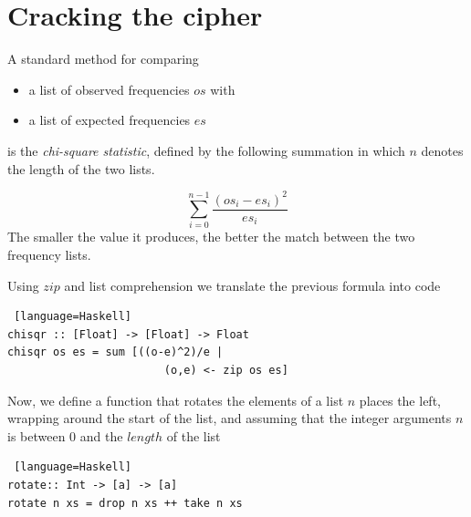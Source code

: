 \documentclass[11pt]{article}
\def\frametitle#1{}
\begin{document}
\section{Cracking the cipher}
\begin{frame}[fragile, label=freq3]
  \frametitle{Frequency Tables cont. } 
  A standard method for comparing 
  \begin{itemize}
  \item a list of observed frequencies $os$ with 
  \item a list of expected frequencies $es$ 
  \end{itemize}
  is the \textit{chi-square statistic}, defined by the following summation in which $n$ denotes the length of the two lists. 

\[\sum_{i=0}^{n-1} \frac{(os_i - es_i)^2}{es_i}\]
\pause
The smaller the value it produces, the better the match between the two frequency lists.  
\vspace{1cm}
\end{frame}

\begin{frame} [fragile, label = test]
  \frametitle{Frequency Tables cont. } 
Using $zip$ and list comprehension we translate the previous formula into code
 
     \begin{onlyenv}
  \begin{lstlisting} [language=Haskell]
chisqr :: [Float] -> [Float] -> Float
chisqr os es = sum [((o-e)^2)/e | 
                        (o,e) <- zip os es]
\end{lstlisting}
 \end{onlyenv}    
 \end{frame}
 
 \begin{frame} [fragile]
    \frametitle{Frequency Tables cont. } 
 Now, we define a function that rotates the elements of a list $n$ places the left, wrapping around the start of the list, and assuming that the integer arguments $n$ is between 0 and the $length$ of the list 
      \begin{onlyenv}
  \begin{lstlisting} [language=Haskell]
rotate:: Int -> [a] -> [a]
rotate n xs = drop n xs ++ take n xs
\end{lstlisting}
 \end{onlyenv}    
 \pagebreak
\end{frame}
 
\end{document}
